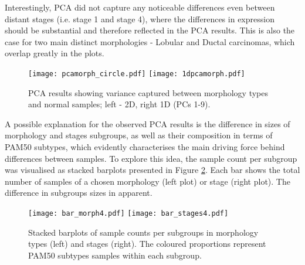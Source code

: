         Interestingly, PCA did not capture any noticeable differences even between distant stages (i.e. stage 1 and stage 4), where the differences in expression should be substantial and therefore reflected in the PCA results. This is also the case for two main distinct morphologies - Lobular and Ductal carcinomas, which overlap greatly in the plots.
    
            \begin{figure}[!h]
            \hspace*{\fill}
            \texttt{[image: pcamorph\_circle.pdf]}\hfill
            \texttt{[image: 1dpcamorph.pdf]}
            \hspace*{\fill}
            \caption[PCA plots showing separation by tumour morphologies (2D and 1D)]{PCA results showing variance captured between morphology types and normal samples; left - 2D, right 1D (PCs 1-9). }
            \label{fig:1dpcamorph}
            \end{figure}

    
    \newpage
    A possible explanation for the observed PCA results is the difference in sizes of morphology and stages subgroups, as well as their composition in terms of PAM50 subtypes, which evidently characterises the main driving force behind differences between samples. To explore this idea, the sample count per subgroup was visualised as stacked barplots presented in Figure \ref{fig:barms}. Each bar shows the total number of samples of a chosen morphology (left plot) or stage (right plot). The difference in subgroups sizes in apparent.
       
        \begin{figure}[!h]
        \centering
        \texttt{[image: bar\_morph4.pdf]}\hfill
        \texttt{[image: bar\_stages4.pdf]}
        \caption[Stacked barplots of samples count per stage and morphology type]{Stacked barplots of sample counts per subgroups in morphology types (left) and stages (right). The coloured proportions represent PAM50 subtypes samples within each subgroup.}
        \label{fig:barms}
        \end{figure}
        
